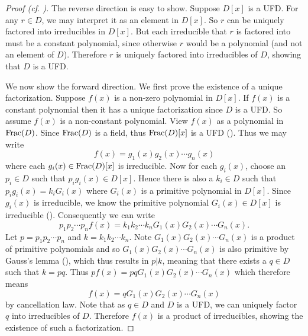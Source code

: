 \begin{proof}[Proof (cf. {\cite[Theorem 18.29]{judson_beezer_2022}})]
    The reverse direction is easy to show. Suppose $D[x]$ is a UFD. For any $r \in D$, we may interpret it as an element in $D[x]$. So $r$ can be uniquely factored into irreducibles in $D[x]$. But each irreducible that $r$ is factored into must be a constant polynomial, since otherwise $r$ would be a polynomial (and not an element of $D$). Therefore $r$ is uniquely factored into irreducibles of $D$, showing that $D$ is a UFD.

    We now show the forward direction. We first prove the existence of a unique factorization. Suppose $f(x)$ is a non-zero polynomial in $D[x]$. If $f(x)$ is a constant polynomial then it has a unique factorization since $D$ is a UFD. So assume $f(x)$ is a non-constant polynomial. View $f(x)$ as a polynomial in $\mathrm{Frac}(D)$. Since $\mathrm{Frac}(D)$ is a field, thus $\mathrm{Frac}(D)[x]$ is a UFD (). Thus we may write
    \[
        f(x) = g_1(x)g_2(x)\cdots g_n(x)
    \]
    where each $g_i(x) \in \mathrm{Frac}(D)[x]$ is irreducible. Now for each $g_i(x)$, choose an $p_i \in D$ such that $p_ig_i(x) \in D[x]$. Hence there is also a $k_i \in D$ such that $p_ig_i(x) = k_iG_i(x)$ where $G_i(x)$ is a primitive polynomial in $D[x]$. Since $g_i(x)$ is irreducible, we know the primitive polynomial $G_i(x) \in D[x]$ is irreducible (). Consequently we can write
    \[
        p_1p_2\cdots p_n f(x) = k_1k_2 \cdots k_n G_1(x)G_2(x) \cdots G_n(x).
    \]
    Let $p = p_1p_2\cdots p_n$ and $k = k_1k_2\cdots k_n$. Note $G_1(x)G_2(x) \cdots G_n(x)$ is a product of primitive polynomials and so $G_1(x)G_2(x) \cdots G_n(x)$ is also primitive by Gauss's lemma (), which thus results in $p \vert k$, meaning that there exists a $q \in D$ such that $k = pq$. Thus $p f(x) = pq G_1(x)G_2(x) \cdots G_n(x)$ which therefore means
    \[
        f(x) = qG_1(x)G_2(x) \cdots G_n(x)
    \]
    by cancellation law. Note that as $q \in D$ and $D$ is a UFD, we can uniquely factor $q$ into irreducibles of $D$. Therefore $f(x)$ is a product of irreducibles, showing the existence of such a factorization.


\end{proof}
